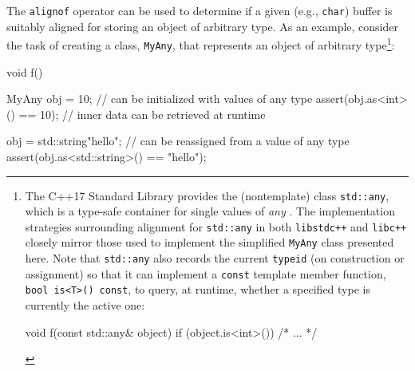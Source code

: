 The \lstinline!alignof! operator can be used to determine if a given (e.g.,
\lstinline!char!) buffer is suitably aligned for storing an object of
arbitrary type. As an example, consider the task of creating a
 class, \lstinline!MyAny!, that represents an object
of arbitrary type{\cprotect\footnote{The C++17 Standard Library provides
the (nontemplate) class \lstinline!std::any!, which is a type-safe
container for single values of \emph{any} . The
implementation strategies surrounding alignment for \lstinline!std::any!
in both \lstinline!libstdc++! and \lstinline!libc++! closely mirror those
used to implement the simplified \lstinline!MyAny! class presented here.
Note that \lstinline!std::any! also records the current \lstinline!typeid!
(on construction or assignment) so that it can implement a
\lstinline!const! template member function,
\lstinline!bool!~\lstinline!is<T>()!~\lstinline!const!, to query, at runtime,
whether a specified type is currently the active one:

\begin{emcppslisting}[style=footcode]
void f(const std::any& object)
{
    if (object.is<int>()) { /* ... */ }
}
\end{emcppslisting}
      }}:

\begin{emcppslisting}
void f()
{
    MyAny obj = 10;               // can be initialized with values of any type
    assert(obj.as<int>() == 10);  // inner data can be retrieved at runtime

    obj = std::string{"hello"};   // can be reassigned from a value of any type
    assert(obj.as<std::string>() == "hello");
}
\end{emcppslisting}
    
